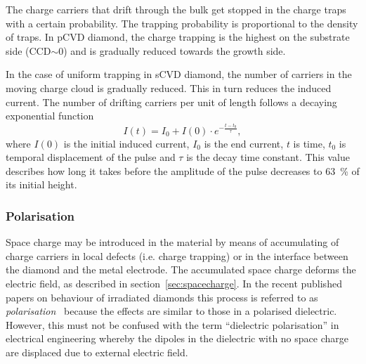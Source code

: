 The charge carriers that drift through the bulk get stopped in the charge traps with a certain probability. The trapping probability is proportional to the density of traps. In pCVD diamond, the charge trapping is the highest on the substrate side (CCD$\sim$0) and is gradually reduced towards the growth side.

In the case of uniform trapping in sCVD diamond, the number of carriers in the moving charge cloud is gradually reduced. This in turn reduces the induced current. The number of drifting carriers per unit of length follows a decaying exponential function
\begin{equation}
\label{eq:decayexp}
I(t)= I_0 + I(0) \cdot e^{-\frac{t-t_0}{\tau} },
\end{equation}
where $I(0)$ is the initial induced current, $I_0$ is the end current, $t$ is time, $t_0$ is temporal displacement of the pulse and $\tau$ is the decay time constant. This value describes how long it takes before the amplitude of the pulse decreases to 63~\% of its initial height.

\subsubsection{Polarisation}
Space charge may be introduced in the material by means of accumulating of charge carriers in local defects (i.e. charge trapping) or in the interface between the diamond and the metal electrode. The accumulated space charge deforms the electric field, as described in section~\ref{sec:spacecharge}. In the recent published papers on behaviour of irradiated diamonds this process is referred to as \emph{polarisation}~\cite{Guthoff:1977429} because the effects are similar to those in a polarised dielectric. However, this must not be confused with the term ``dielectric polarisation'' in electrical engineering whereby the dipoles in the dielectric with no space charge are displaced due to external electric field.

